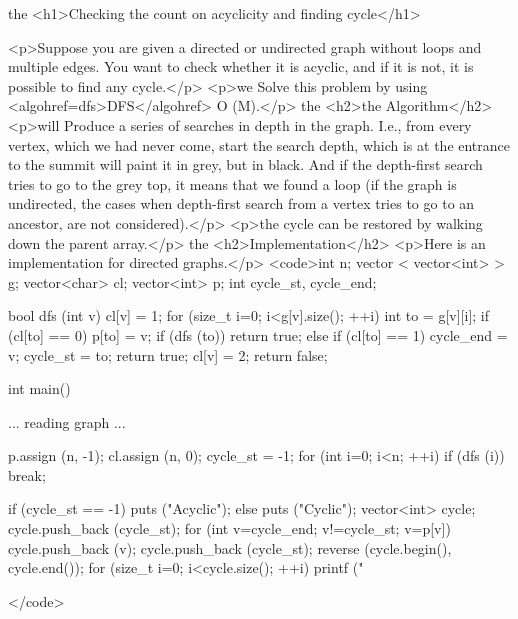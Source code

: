 the <h1>Checking the count on acyclicity and finding cycle</h1>

<p>Suppose you are given a directed or undirected graph without loops and multiple edges. You want to check whether it is acyclic, and if it is not, it is possible to find any cycle.</p>
<p>we Solve this problem by using <algohref=dfs>DFS</algohref> O (M).</p>
the <h2>the Algorithm</h2>
<p>will Produce a series of searches in depth in the graph. I.e., from every vertex, which we had never come, start the search depth, which is at the entrance to the summit will paint it in grey, but in black. And if the depth-first search tries to go to the grey top, it means that we found a loop (if the graph is undirected, the cases when depth-first search from a vertex tries to go to an ancestor, are not considered).</p>
<p>the cycle can be restored by walking down the parent array.</p>
the <h2>Implementation</h2>
<p>Here is an implementation for directed graphs.</p>
<code>int n;
vector < vector<int> > g;
vector<char> cl;
vector<int> p;
int cycle_st, cycle_end;

bool dfs (int v) {
cl[v] = 1;
for (size_t i=0; i<g[v].size(); ++i) {
int to = g[v][i];
if (cl[to] == 0) {
p[to] = v;
if (dfs (to)) return true;
}
else if (cl[to] == 1) {
cycle_end = v;
cycle_st = to;
return true;
}
}
cl[v] = 2;
return false;
}

int main() {
... reading graph ...

p.assign (n, -1);
cl.assign (n, 0);
cycle_st = -1;
for (int i=0; i<n; ++i)
if (dfs (i))
break;

if (cycle_st == -1)
puts ("Acyclic");
else {
puts ("Cyclic");
vector<int> cycle;
cycle.push_back (cycle_st);
for (int v=cycle_end; v!=cycle_st; v=p[v])
cycle.push_back (v);
cycle.push_back (cycle_st);
reverse (cycle.begin(), cycle.end());
for (size_t i=0; i<cycle.size(); ++i)
printf ("%
}
}</code>